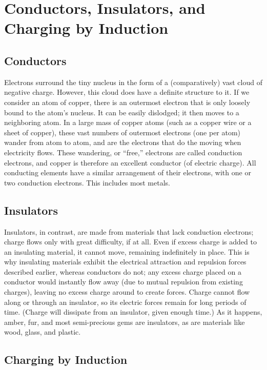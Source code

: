 \documentclass[14pt]{memoir}
\begin{document}
\section{Conductors, Insulators, and Charging by Induction}

\subsection{Conductors}

Electrons surround the tiny nucleus in the form of a (comparatively) vast cloud of negative charge. However, this cloud does have a definite structure to it. If we consider an atom of copper, there is an outermost electron that is only loosely bound to the atom’s nucleus. It can be easily dislodged; it then moves to a neighboring atom. In a large mass of copper atoms (such as a copper wire or a sheet of copper), these vast numbers of outermost electrons (one per atom) wander from atom to atom, and are the electrons that do the moving when electricity flows. These wandering, or “free,” electrons are called conduction electrons, and copper is therefore an excellent conductor (of electric charge). All conducting elements have a similar arrangement of their electrons, with one or two conduction electrons. This includes most metals.

\subsection{Insulators}

Insulators, in contrast, are made from materials that lack conduction electrons; charge flows only with great difficulty, if at all. Even if excess charge is added to an insulating material, it cannot move, remaining indefinitely in place. This is why insulating materials exhibit the electrical attraction and repulsion forces described earlier, whereas conductors do not; any excess charge placed on a conductor would instantly flow away (due to mutual repulsion from existing charges), leaving no excess charge around to create forces. Charge cannot flow along or through an insulator, so its electric forces remain for long periods of time. (Charge will dissipate from an insulator, given enough time.) As it happens, amber, fur, and most semi-precious gems are insulators, as are materials like wood, glass, and plastic.

\subsection{Charging by Induction}
\end{document}
